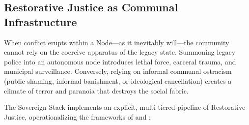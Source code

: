 \subsection{Restorative Justice as Communal Infrastructure}

When conflict erupts within a Node---as it inevitably will---the community cannot rely on the coercive apparatus of the legacy state. Summoning legacy police into an autonomous node introduces lethal force, carceral trauma, and municipal surveillance. Conversely, relying on informal communal ostracism (public shaming, informal banishment, or ideological cancellation) creates a climate of terror and paranoia that destroys the social fabric.

The Sovereign Stack implements an explicit, multi-tiered pipeline of Restorative Justice, operationalizing the frameworks of \textcite{zehr1990} and \textcite{ostrom1990}:
